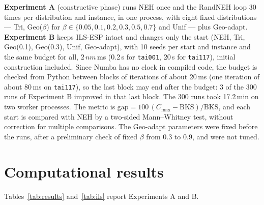 \documentclass[10pt,a4paper]{article}
\begin{document}
\textbf{Experiment A} (constructive phase) runs NEH once and the RandNEH loop 30 times per distribution
and instance, in one process, with eight fixed distributions --- Tri, Geo($\beta$) for $\beta\in\{0.05, 0.1, 0.2, 0.3,
0.5, 0.7\}$ and Unif --- plus Geo-adapt. \textbf{Experiment B} keeps ILS-ESP intact and changes only the
start (NEH, Tri, Geo(0.1), Geo(0.3), Unif, Geo-adapt), with 10 seeds per start and instance and the same
budget for all, $2\,nm$\,ms (0.2\,s for \texttt{tai001}, 20\,s for \texttt{tai117}), initial
construction included. Since Numba has no clock in compiled code, the budget is checked from Python
between blocks of iterations of about 20\,ms (one iteration of about 80\,ms on \texttt{tai117}), so the
last block may end after the budget: 3 of the 300 runs of Experiment B improved in that last block. The 300
runs took 17.2\,min on two worker processes. The metric is $\text{gap}=100\,(C_{\max}-\text{BKS})/\text{BKS}$, and
each start is compared with NEH by a two-sided Mann--Whitney test, without correction for multiple
comparisons. The Geo-adapt parameters were fixed before the runs, after a preliminary check of fixed
$\beta$ from 0.3 to 0.9, and were not tuned.

\section{Computational results}
\label{sec:res}

Tables~\ref{tab:results} and~\ref{tab:ils} report Experiments A and B.
\end{document}
